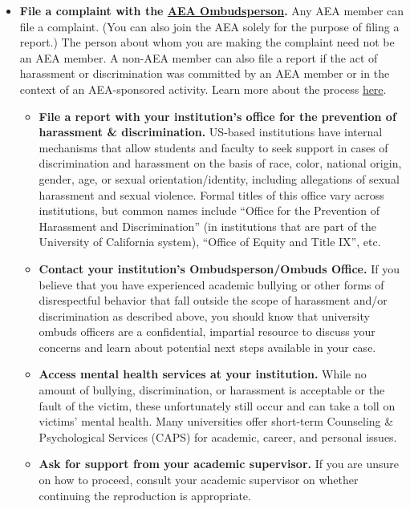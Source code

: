\documentclass[
]{book}
\providecommand{\tightlist}{%
  \setlength{\itemsep}{0pt}\setlength{\parskip}{0pt}}
\begin{document}
\begin{itemize}
\tightlist
\item
  \textbf{File a complaint with the \href{https://www.aeaweb.org/about-aea/aea-ombudsperson}{AEA Ombudsperson}.} Any AEA member can file a complaint. (You can also join the AEA solely for the purpose of filing a report.) The person about whom you are making the complaint need not be an AEA member. A non-AEA member can also file a report if the act of harassment or discrimination was committed by an AEA member or in the context of an AEA-sponsored activity. Learn more about the process \href{https://www.aeaweb.org/about-aea/aea-ombudsperson/faq}{here}.

  \begin{itemize}
  \tightlist
  \item
    \textbf{File a report with your institution's office for the prevention of harassment \& discrimination.} US-based institutions have internal mechanisms that allow students and faculty to seek support in cases of discrimination and harassment on the basis of race, color, national origin, gender, age, or sexual orientation/identity, including allegations of sexual harassment and sexual violence. Formal titles of this office vary across institutions, but common names include ``Office for the Prevention of Harassment and Discrimination'' (in institutions that are part of the University of California system), ``Office of Equity and Title IX'', etc.
  \item
    \textbf{Contact your institution's Ombudsperson/Ombuds Office.} If you believe that you have experienced academic bullying or other forms of disrespectful behavior that fall outside the scope of harassment and/or discrimination as described above, you should know that university ombuds officers are a confidential, impartial resource to discuss your concerns and learn about potential next steps available in your case.
  \item
    \textbf{Access mental health services at your institution.} While no amount of bullying, discrimination, or harassment is acceptable or the fault of the victim, these unfortunately still occur and can take a toll on victims' mental health. Many universities offer short-term Counseling \& Psychological Services (CAPS) for academic, career, and personal issues.
  \item
    \textbf{Ask for support from your academic supervisor.} If you are unsure on how to proceed, consult your academic supervisor on whether continuing the reproduction is appropriate.
  \end{itemize}
\end{itemize}
\end{document}
